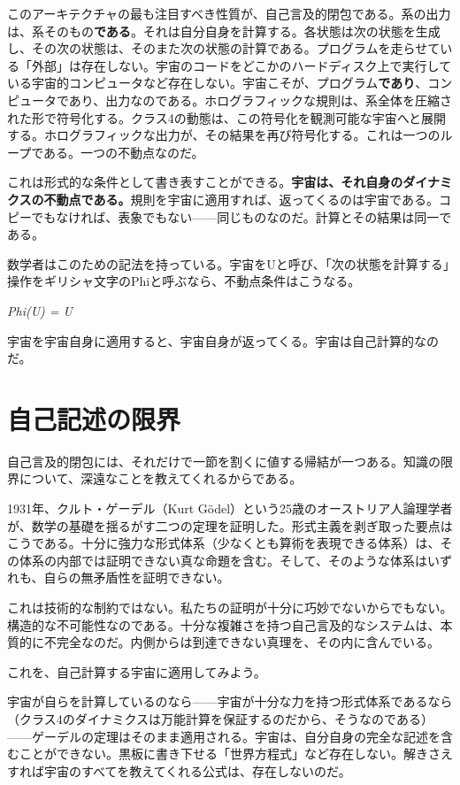 \documentclass[11pt, twoside, openright]{book}
\begin{document}
このアーキテクチャの最も注目すべき性質が、自己言及的閉包である。系の出力は、系そのもの\textbf{である}。それは自分自身を計算する。各状態は次の状態を生成し、その次の状態は、そのまた次の状態の計算である。プログラムを走らせている「外部」は存在しない。宇宙のコードをどこかのハードディスク上で実行している宇宙的コンピュータなど存在しない。宇宙こそが、プログラム\textbf{であり}、コンピュータであり、出力なのである。ホログラフィックな規則は、系全体を圧縮された形で符号化する。クラス4の動態は、この符号化を観測可能な宇宙へと展開する。ホログラフィックな出力が、その結果を再び符号化する。これは一つのループである。一つの不動点なのだ。

これは形式的な条件として書き表すことができる。\textbf{宇宙は、それ自身のダイナミクスの不動点である。}規則を宇宙に適用すれば、返ってくるのは宇宙である。コピーでもなければ、表象でもない------同じものなのだ。計算とその結果は同一である。

数学者はこのための記法を持っている。宇宙をUと呼び、「次の状態を計算する」操作をギリシャ文字のPhiと呼ぶなら、不動点条件はこうなる。

\textit{Phi(U) = U}

宇宙を宇宙自身に適用すると、宇宙自身が返ってくる。宇宙は自己計算的なのだ。


\section*{自己記述の限界}

自己言及的閉包には、それだけで一節を割くに値する帰結が一つある。知識の限界について、深遠なことを教えてくれるからである。

1931年、クルト・ゲーデル（Kurt Gödel）という25歳のオーストリア人論理学者が、数学の基礎を揺るがす二つの定理を証明した。形式主義を剥ぎ取った要点はこうである。十分に強力な形式体系（少なくとも算術を表現できる体系）は、その体系の内部では証明できない真な命題を含む。そして、そのような体系はいずれも、自らの無矛盾性を証明できない。

これは技術的な制約ではない。私たちの証明が十分に巧妙でないからでもない。構造的な不可能性なのである。十分な複雑さを持つ自己言及的なシステムは、本質的に不完全なのだ。内側からは到達できない真理を、その内に含んでいる。

これを、自己計算する宇宙に適用してみよう。

宇宙が自らを計算しているのなら------宇宙が十分な力を持つ形式体系であるなら（クラス4のダイナミクスは万能計算を保証するのだから、そうなのである）------ゲーデルの定理はそのまま適用される。宇宙は、自分自身の完全な記述を含むことができない。黒板に書き下せる「世界方程式」など存在しない。解きさえすれば宇宙のすべてを教えてくれる公式は、存在しないのだ。
\end{document}
